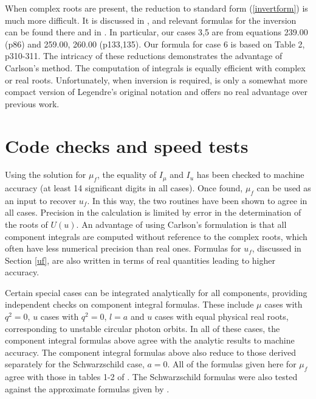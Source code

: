 \documentclass[apj]{emulateapj}
\begin{document}
When complex roots are present, the reduction to standard form (\ref{invertform}) is much more difficult. It is discussed in \citet{erdelyi1981}, and relevant formulas for the inversion can be found there and in \citet{byrdfriedman}. In particular, our cases 3,5 are from \citet{byrdfriedman} equations 239.00 (p86) and 259.00, 260.00 (p133,135). Our formula for case 6 is based on \citet{erdelyi1981} Table 2, p310-311. The intricacy of these reductions demonstrates the advantage of Carlson's method. The computation of integrals is equally efficient with complex or real roots. Unfortunately, when inversion is required, \citet{carlson2005} is only a somewhat more compact version of Legendre's original notation and offers no real advantage over previous work.

\section{Code checks and speed tests}

\label{checks}

Using the solution for $\mu_f$, the equality of $I_\mu$ and $I_u$ has been checked to machine accuracy (at least 14 significant digits in all cases). Once found, $\mu_f$ can be used as an input to recover $u_f$. In this way, the two routines have been shown to agree in all cases. Precision in the calculation is limited by error in the determination of the roots of $U(u)$. An advantage of using Carlson's formulation is that all component integrals are computed without reference to the complex roots, which often have less numerical precision than real ones. Formulas for $u_f$, discussed in Section \ref{uf}, are also written in terms of real quantities leading to higher accuracy.

Certain special cases can be integrated analytically for all components, providing independent checks on component integral formulas. These include $\mu$ cases with $q^2=0$, $u$ cases with $q^2 = 0$, $l=a$ and $u$ cases with equal physical real roots, corresponding to unstable circular photon orbits. In all of these cases, the component integral formulas above agree with the analytic results to machine accuracy. The component integral formulas above also reduce to those derived separately for the Schwarzschild case, $a=0$. All of the formulas given here for $\mu_f$ agree with those in tables 1-2 of . The Schwarzschild formulas were also tested against the approximate formulas given by \citet{belo2002}.
\end{document}
